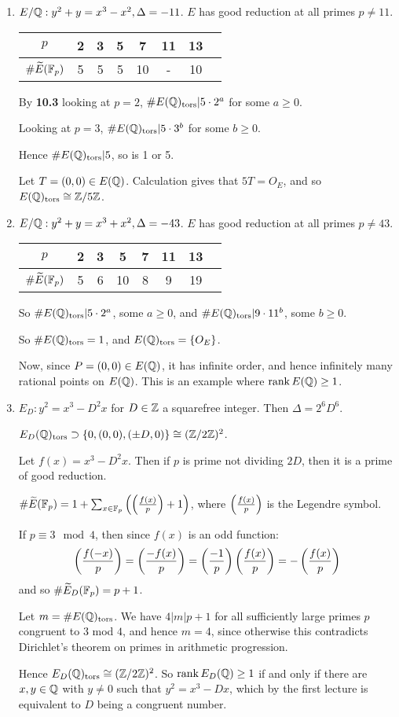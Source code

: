 \documentclass[10pt,a4paper]{article}
\begin{document}
\begin{enumerate}
  \item $E/\mathbb{Q} : y^2+y=x^3-x^2, \Delta = -11$.
  $E$ has good reduction at all primes $p \neq 11$.

  \begin{tabular}{c|ccccccc}
    $p$ & 2 & 3 & 5 & 7 & 11 & 13\\\hline
    $\#\widetilde{E}(\mathbb{F}_p)$ & 5 & 5 & 5 & 10 & - & 10
  \end{tabular}

  By \textbf{10.3} looking at $p=2$, $\#E(\mathbb{Q})_{\text{tors}}|5\cdot 2^a$ for some $a \geq 0$.

  Looking at $p=3$, $\#E(\mathbb{Q})_{\text{tors}}|5\cdot 3^b$ for some $b \geq 0$.

  Hence $\#E(\mathbb{Q})_{\text{tors}}|5$, so is 1 or 5.

  Let $T = (0,0) \in E(\mathbb{Q})$. Calculation gives that $5T = O_E$, and so $E(\mathbb{Q})_{\text{tors}} \cong \mathbb{Z}/5\mathbb{Z}$.

  \item $E/\mathbb{Q} : y^2+y = x^3+x^2, \Delta = -43$. $E$ has good reduction at all primes $p \neq 43$.

  \begin{tabular}{c|ccccccc}
    $p$ & 2 & 3 & 5 & 7 & 11 & 13\\\hline
    $\#\widetilde{E}(\mathbb{F}_p)$ & 5 & 6 & 10 & 8 & 9 & 19
  \end{tabular}

  So $\#E(\mathbb{Q})_{\text{tors}}|5\cdot 2^a$, some $a\geq 0$, and $\#E(\mathbb{Q})_{\text{tors}}|9\cdot 11^b$, some $b \geq 0$.

  So $\#E(\mathbb{Q})_{\text{tors}} = 1$, and $E(\mathbb{Q})_{\text{tors}} = \{O_E\}$.

  Now, since $P = (0,0)\in E(\mathbb{Q})$, it has infinite order, and hence infinitely many rational points on $E(\mathbb{Q})$. This is an example where $\operatorname{rank} E(\mathbb{Q}) \geq 1$.

  \item $E_D : y^2=x^3-D^2x$ for $D \in \mathbb{Z}$ a squarefree integer. Then $\Delta = 2^6D^6$.

  $E_D(\mathbb{Q})_{\text{tors}} \supset \{0, (0,0), (\pm D, 0)\} \cong (\mathbb{Z}/2\mathbb{Z})^2$.

  Let $f(x) = x^3-D^2x$. Then if $p$ is prime not dividing $2D$, then it is a prime of good reduction.

  $\#\widetilde{E}(\mathbb{F}_p) =1+ \sum_{x\in\mathbb{F}_p}\left(\left(\frac{f(x)}{p}\right)+1\right)$, where $\left(\frac{f(x)}{p}\right)$ is the Legendre symbol.

  If $p \equiv 3 \mod 4$, then since $f(x)$ is an odd function:
  \[\left(\frac{f(-x)}{p}\right) = \left(\frac{-f(x)}{p}\right) = \left(\frac{-1}{p}\right)\left(\frac{f(x)}{p}\right) = -\left(\frac{f(x)}{p}\right)\]
  and so $\#\widetilde{E}_D(\mathbb{F}_p) = p+1$.

  Let $m = \#E(\mathbb{Q})_{\text{tors}}$. We have $4|m|p+1$ for all sufficiently large primes $p$ congruent to $3$ mod $4$, and hence $m=4$, since otherwise this contradicts Dirichlet's theorem on primes in arithmetic progression.

  Hence $E_D(\mathbb{Q})_{\text{tors}} \cong (\mathbb{Z}/2\mathbb{Z})^2$. So $\operatorname{rank} E_D(\mathbb{Q}) \geq 1$ if and only if there are $x, y \in \mathbb{Q}$ with $y \neq 0$ such that $y^2 = x^3-Dx$, which by the first lecture is equivalent to $D$ being a congruent number.
\end{enumerate}
\end{document}
